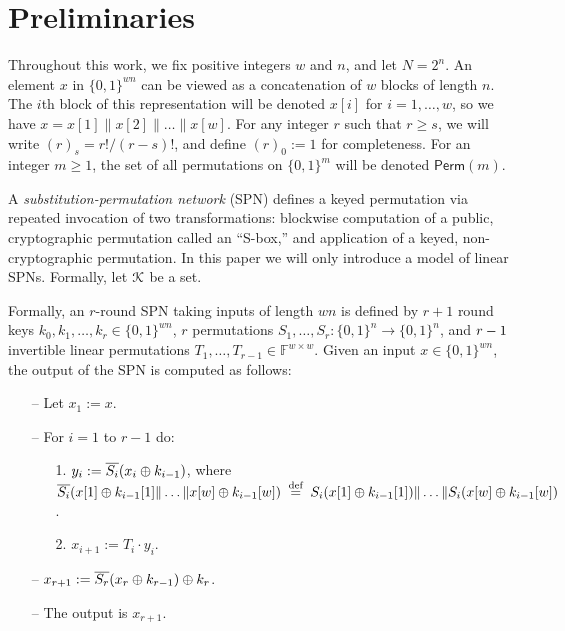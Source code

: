 

\section{Preliminaries}
\label{sec:preliminary}

Throughout this work, we fix positive integers $w$ and $n$, and let $N=2^n$. An element $x$ in $\{0,1\}^{wn}$ can be viewed as a concatenation of $w$ blocks of length $n$. The $i$th block of this representation will be denoted $x[i]$ for $i=1,\ldots,w$, so we have $x=x[1]\|x[2]\|\ldots\|x[w]$. For any integer $r$ such that $r\geq s$, we will write $(r)_s = r!/(r-s)!$, and define $(r)_0:=1$ for completeness. For an integer $m\geq1$, the set of all permutations on $\{0, 1\}^m$ will be denoted $\textsf{Perm}(m)$.




\arrangespace
{}
%
A \emph{substitution-permutation network} (SPN) defines a keyed permutation via repeated invocation of two transformations: blockwise computation of a public, cryptographic permutation called an ``S-box,'' and application of a keyed, non-cryptographic permutation. In this paper we will only introduce a model of linear SPNs. Formally, let $\mathcal{K}$ be a
set.





Formally, an $r$-round SPN taking inputs of length $w n$ is defined by $r+1$ round keys $k_0,k_1,\ldots,k_r\in\{0,1\}^{wn}$, $r$ permutations $S_1,\ldots,S_r:\{0,1\}^{n} \rightarrow \{0,1\}^{n}$, and $\mathnormal{r}-1$ invertible linear permutations $T_1,\ldots,T_{r-1}\in\mathbb{F}^{w\times w}$. Given an input $x \in \{0,1\}^{w n}$, the output of the SPN is computed as follows:

\begin{itemize}
  \item[--]
  Let $x_1 := x$.
  \item[--]
  For $i = 1$ to $r-1$ do:
  \begin{itemize}
  	\item[1.] $y_{i} := \overline{S_i}(x_{i}\oplus k_{i-1})$, where $\overline{S_i}(x[1]\oplus k_{i-1}[1]\|\ldots\| x[w]\oplus k_{i-1}[w]) \stackrel{\text { def }}{=} S_i(x[1]\oplus k_{i-1}[1])\|\ldots\| S_i(x[w]\oplus k_{i-1}[w])$.
    \item[2.] 
    $x_{i + 1} := T_i\cdot y_i$.
  \end{itemize}
  \item[--] $x_{r+1} := \overline{S_r}(x_r\oplus k_{r-1})\oplus k_r$.
  \item[--]
  The output is $x_{r+1}$.
\end{itemize}

